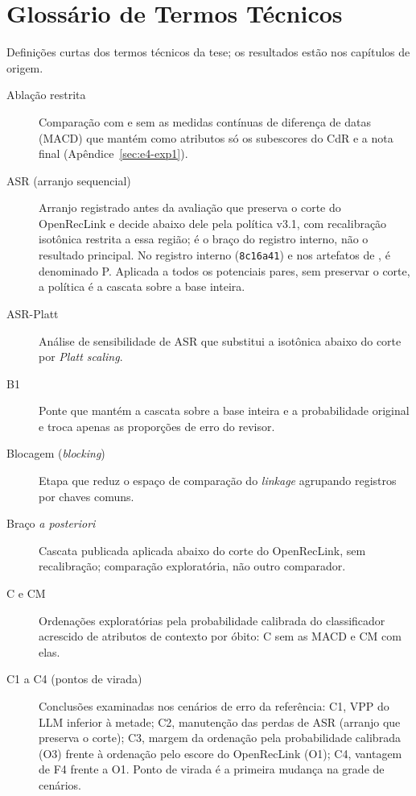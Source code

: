 \chapter*{Glossário de Termos Técnicos}

Definições curtas dos termos técnicos da tese; os resultados estão nos capítulos de origem.

\begin{description}

\item[Ablação restrita] Comparação com e sem as medidas contínuas de diferença de datas (MACD) que mantém como atributos só os subescores do CdR e a nota final (Apêndice~\ref{sec:e4-exp1}).

\item[ASR (arranjo sequencial)] Arranjo registrado antes da avaliação que preserva o corte do OpenRecLink e decide abaixo dele pela política v3.1, com recalibração isotônica restrita a essa região; é o braço do registro interno, não o resultado principal. No registro interno (\texttt{8c16a41}) e nos artefatos de , é denominado P. Aplicada a todos os potenciais pares, sem preservar o corte, a política é a cascata sobre a base inteira.

\item[ASR-Platt] Análise de sensibilidade de ASR que substitui a isotônica abaixo do corte por \textit{Platt scaling}.

\item[B1] Ponte que mantém a cascata sobre a base inteira e a probabilidade original e troca apenas as proporções de erro do revisor.

\item[Blocagem (\textit{blocking})] Etapa que reduz o espaço de comparação do \textit{linkage} agrupando registros por chaves comuns.

\item[Braço \textit{a posteriori}] Cascata publicada aplicada abaixo do corte do OpenRecLink, sem recalibração; comparação exploratória, não outro comparador.

\item[C e CM] Ordenações exploratórias pela probabilidade calibrada do classificador acrescido de atributos de contexto por óbito: C sem as MACD e CM com elas.

\item[C1 a C4 (pontos de virada)] Conclusões examinadas nos cenários de erro da referência: C1, VPP do LLM inferior à metade; C2, manutenção das perdas de ASR (arranjo que preserva o corte); C3, margem da ordenação pela probabilidade calibrada (O3) frente à ordenação pelo escore do OpenRecLink (O1); C4, vantagem de F4 frente a O1. Ponto de virada é a primeira mudança na grade de cenários.


\end{description}
